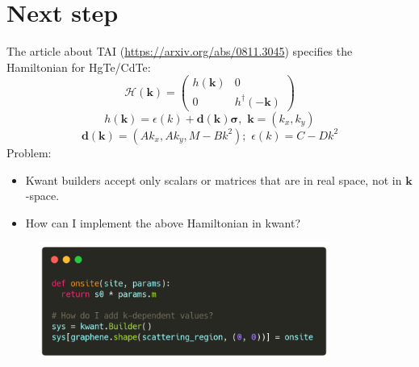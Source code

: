 \documentclass[12pt]{article}
\newcommand{\bb}[1]{\mathbf{#1}}
\numberwithin{equation}{section}
\begin{document}
\section*{Next step}
The article about TAI (\url{https://arxiv.org/abs/0811.3045}) specifies the Hamiltonian for HgTe/CdTe:
\begin{equation*}
  \mathcal H(\bb k) = \left(
    \begin{array}{cc}
      h(\bb k) & 0 \\
      0 & h^{\dagger}(-\bb k) 
    \end{array}
    \right)
\end{equation*}
\begin{equation*}
  h(\bb k) = \epsilon(k) + \bb d (\bb k)\bb\sigma \textrm{, } \, \bb k = (k_x, k_y) 
\end{equation*}
\begin{equation*}
  \bb d(\bb k ) = (Ak_x, Ak_y, M-Bk^2) \textrm{; } \, \epsilon(k) = C-Dk^2
\end{equation*}
Problem:
\begin{itemize}
  \item Kwant builders accept only scalars or matrices that are in real space, not in $\bb k$-space.
  \item How can I implement the above Hamiltonian in kwant?
\end{itemize}

\begin{figure}[h!]
  \begin{center}
  \includegraphics[width=0.85\textwidth]{./media/k-space-problem.png}
  \end{center}
\end{figure}
\end{document}
